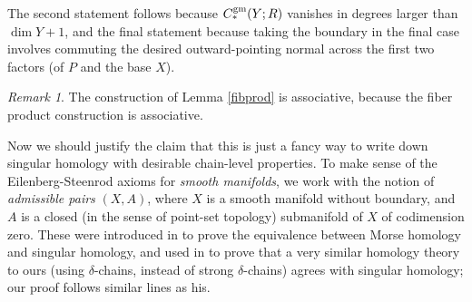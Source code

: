 \documentclass[10pt,a4paper]{amsart}
\theoremstyle{definition}
\theoremstyle{remark}
\newtheorem{remark}[theorem]{Remark}
\numberwithin{figure}{qchap}
\begin{document}
The second statement follows because $C^{\textup{gm}}_*(Y;R)$ vanishes in degrees larger than $\dim Y + 1$, and the final statement because taking the boundary in the final case involves commuting the desired outward-pointing normal across the first two factors (of $P$ and the base $X$). 

\begin{remark}\label{rmk:assoc2}
The construction of Lemma \ref{fibprod} is associative, because the fiber product construction is associative. 
\end{remark}

Now we should justify the claim that this is just a fancy way to write down singular homology with desirable chain-level properties. To make sense of the Eilenberg-Steenrod axioms for \emph{smooth manifolds}, we work with the notion of \emph{admissible pairs} $(X,A)$, where $X$ is a smooth manifold without boundary, and $A$ is a closed (in the sense of point-set topology) submanifold of $X$ of codimension zero. These were introduced in \cite{Schwarz} to prove the equivalence between Morse homology and singular homology, and used in \cite[Theorem~4.1.13]{Lin} to prove that a very similar homology theory to ours (using $\delta$-chains, instead of strong $\delta$-chains) agrees with singular homology; our proof follows similar lines as his.
\end{document}
